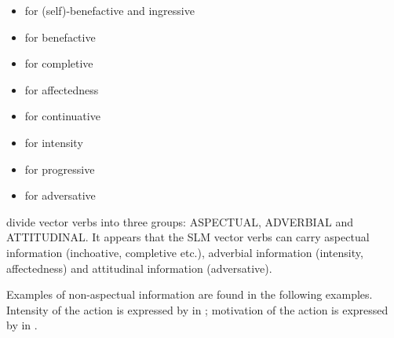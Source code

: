 \begin{itemize}
 \item {} for (self)-benefactive and ingressive
 \item {} for benefactive
 \item {} for completive
 \item {} for affectedness
 \item {} for continuative
 \item {} for intensity
 \item {} for progressive
 \item {} for adversative 
\end{itemize}


\citet{AbbiEtAl1991EVC} divide vector verbs into three groups: ASPECTUAL, ADVERBIAL and ATTITUDINAL. It appears that the SLM vector verbs can carry aspectual information (inchoative, completive etc.), adverbial information (intensity, affectedness) and  attitudinal information (adversative).

Examples of  non-aspectual information are found in the following examples. Intensity of the action is expressed by  in ; motivation of the action is expressed by  in .



\\



